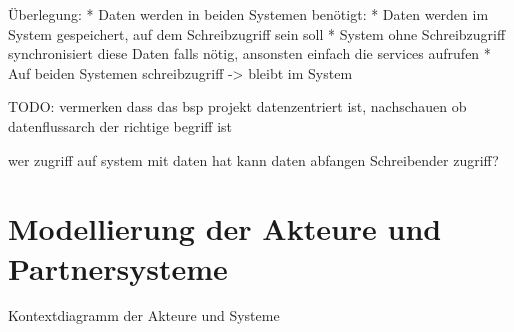 Überlegung:
* Daten werden in beiden Systemen benötigt:
 * Daten werden im System gespeichert, auf dem Schreibzugriff sein soll
 * System ohne Schreibzugriff synchronisiert diese Daten falls nötig, ansonsten einfach die services aufrufen
 * Auf beiden Systemen schreibzugriff -> bleibt im System

 TODO: vermerken dass das bsp projekt datenzentriert ist, nachschauen ob datenflussarch der richtige begriff ist

wer zugriff auf system mit daten hat kann daten abfangen
Schreibender zugriff?


\section{Modellierung der Akteure und Partnersysteme}
Kontextdiagramm der Akteure und Systeme
